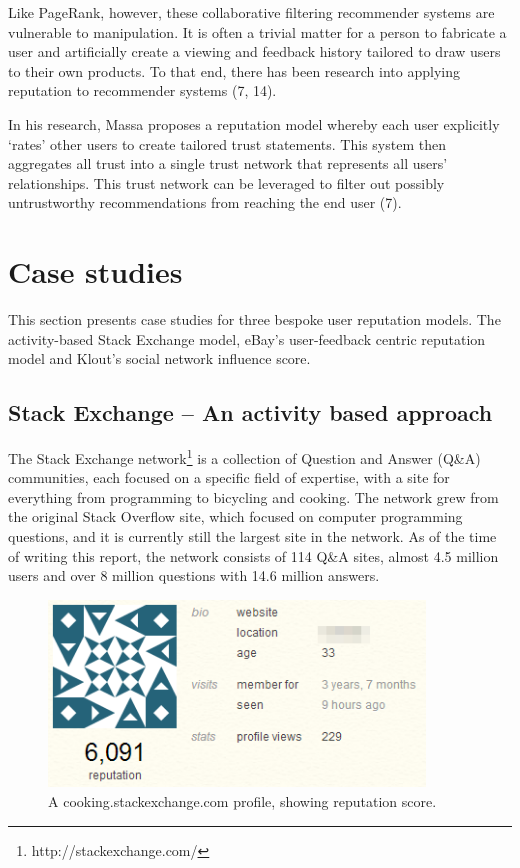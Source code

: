 \documentclass[]{final_report}
\begin{document}
Like PageRank, however, these collaborative filtering recommender systems are vulnerable to manipulation. It is often a trivial matter for a person to fabricate a user and artificially create a viewing and feedback history tailored to draw users to their own products. To that end, there has been research into applying reputation to recommender systems (7, 14).

In his research, Massa proposes a reputation model whereby each user explicitly `rates' other users to create tailored trust statements. This system then aggregates all trust into a single trust network that represents all users' relationships. This trust network can be leveraged to filter out possibly untrustworthy recommendations from reaching the end user (7).


\section{Case studies}

This section presents case studies for three bespoke user reputation models. The activity-based Stack Exchange model, eBay's user-feedback centric reputation model and Klout's social network influence score.

\subsection{Stack Exchange -- An activity based approach}

The Stack Exchange network\footnote{http://stackexchange.com/} is a collection of Question and Answer (Q\&A) communities, each focused on a specific field of expertise, with a site for everything from programming to bicycling and cooking. The network grew from the original Stack Overflow site, which focused on computer programming questions, and it is currently still the largest site in the network. As of the time of writing this report, the network consists of 114 Q\&A sites, almost 4.5 million users and over 8 million questions with 14.6 million answers.

\begin{figure}[ht!]
\centering
\includegraphics[width=100mm]{chap2/serep.png}
\caption{A cooking.stackexchange.com profile, showing reputation score.}
\label{gra:serep}
\end{figure}
\end{document}
